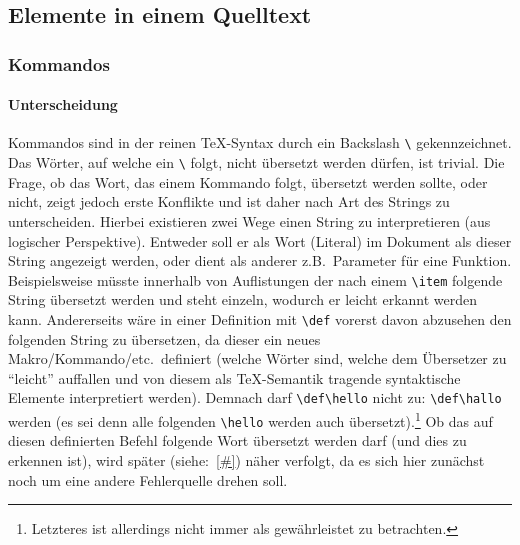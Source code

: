 \subsection{Elemente in einem Quelltext}
\subsubsection{Kommandos}
\paragraph{Unterscheidung}
Kommandos sind in der reinen \TeX{}-Syntax durch ein Backslash \verb|\| gekennzeichnet. Das Wörter, auf welche ein \verb|\| folgt, nicht übersetzt werden dürfen, ist trivial. 
Die Frage, ob das Wort, das einem Kommando folgt, übersetzt werden sollte, oder nicht, zeigt jedoch erste Konflikte und ist daher nach Art des Strings zu unterscheiden. %
Hierbei existieren zwei Wege einen String zu interpretieren (aus logischer Perspektive). Entweder soll er als Wort (Literal) im Dokument als dieser String angezeigt werden, oder dient als anderer z.B.\ Parameter für eine Funktion.%
Beispielsweise müsste innerhalb von Auflistungen der nach einem \verb|\item| folgende String übersetzt werden und steht einzeln, wodurch er leicht erkannt werden kann. Andererseits wäre in einer Definition mit \verb|\def| vorerst davon abzusehen den folgenden String zu übersetzen, da dieser ein neues Makro/Kommando/etc.\ definiert (welche Wörter sind, welche dem Übersetzer zu \enquote{leicht} auffallen und von diesem als \TeX{}-Semantik tragende syntaktische Elemente interpretiert werden). 
Demnach darf \verb|\def\hello| nicht zu: \verb|\def\hallo| werden (es sei denn alle folgenden \verb|\hello| werden auch übersetzt).\footnote{Letzteres ist allerdings nicht immer als gewährleistet zu betrachten.}%
Ob das auf diesen definierten Befehl folgende Wort übersetzt werden darf (und dies zu erkennen ist), wird später (siehe:~\ref{#}) näher verfolgt, da es sich hier zunächst noch um eine andere Fehlerquelle drehen soll. 


